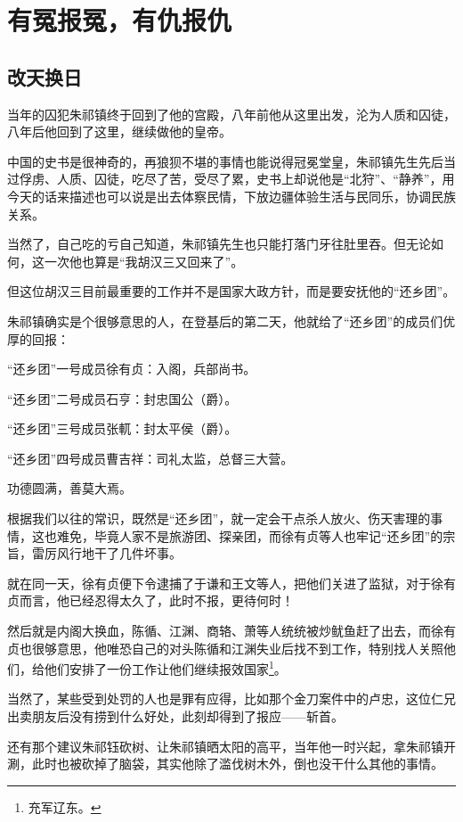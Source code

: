 \section{有冤报冤，有仇报仇}
\ifnum{}
	\begin{multicols}{\theparacolNo}
\fi
\subsection{改天换日}
当年的囚犯朱祁镇终于回到了他的宫殿，八年前他从这里出发，沦为人质和囚徒，八年后他回到了这里，继续做他的皇帝。

中国的史书是很神奇的，再狼狈不堪的事情也能说得冠冕堂皇，朱祁镇先生先后当过俘虏、人质、囚徒，吃尽了苦，受尽了累，史书上却说他是“北狩”、“静养”，用今天的话来描述也可以说是出去体察民情，下放边疆体验生活与民同乐，协调民族关系。

当然了，自己吃的亏自己知道，朱祁镇先生也只能打落门牙往肚里吞。但无论如何，这一次他也算是“我胡汉三又回来了”。

但这位胡汉三目前最重要的工作并不是国家大政方针，而是要安抚他的“还乡团”。

朱祁镇确实是个很够意思的人，在登基后的第二天，他就给了“还乡团”的成员们优厚的回报：

“还乡团”一号成员徐有贞：入阁，兵部尚书。

“还乡团”二号成员石亨：封忠国公（爵）。

“还乡团”三号成员张軏：封太平侯（爵）。

“还乡团”四号成员曹吉祥：司礼太监，总督三大营。

功德圆满，善莫大焉。

根据我们以往的常识，既然是“还乡团”，就一定会干点杀人放火、伤天害理的事情，这也难免，毕竟人家不是旅游团、探亲团，而徐有贞等人也牢记“还乡团”的宗旨，雷厉风行地干了几件坏事。

就在同一天，徐有贞便下令逮捕了于谦和王文等人，把他们关进了监狱，对于徐有贞而言，他已经忍得太久了，此时不报，更待何时！

然后就是内阁大换血，陈循、江渊、商辂、萧等人统统被炒鱿鱼赶了出去，而徐有贞也很够意思，他唯恐自己的对头陈循和江渊失业后找不到工作，特别找人关照他们，给他们安排了一份工作让他们继续报效国家\footnote{充军辽东。}。

当然了，某些受到处罚的人也是罪有应得，比如那个金刀案件中的卢忠，这位仁兄出卖朋友后没有捞到什么好处，此刻却得到了报应——斩首。

还有那个建议朱祁钰砍树、让朱祁镇晒太阳的高平，当年他一时兴起，拿朱祁镇开涮，此时也被砍掉了脑袋，其实他除了滥伐树木外，倒也没干什么其他的事情。


\end{multicols}
